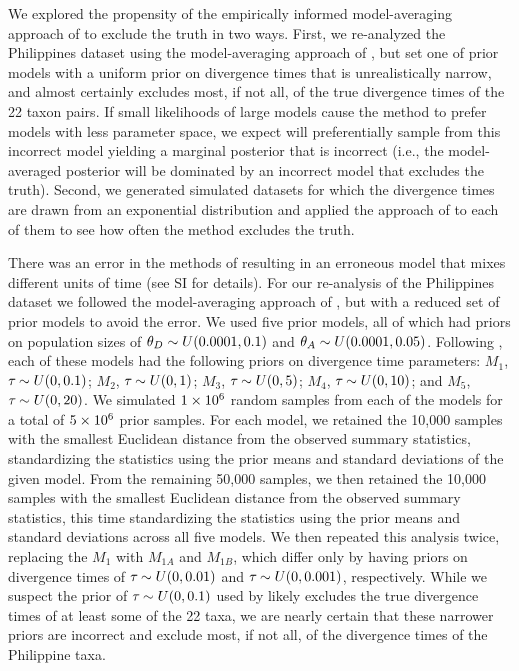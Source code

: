 \documentclass[letterpaper,12pt]{article}
\begin{document}
\begin{linenumbers}
We explored the propensity of the empirically informed model-averaging approach
of \citet{Hickerson2013} to exclude the truth in two ways.
First, we re-analyzed the Philippines dataset using the model-averaging approach
of \citet{Hickerson2013}, but set one of prior models with a uniform prior on
divergence times that is unrealistically narrow, and almost certainly excludes
most, if not all, of the true divergence times of the 22 taxon pairs.
If small likelihoods of large models cause the method to prefer models with
less parameter space, we expect \msb will preferentially sample from this
incorrect model yielding a marginal posterior that is incorrect (i.e., the
model-averaged posterior will be dominated by an incorrect model that excludes
the truth).
Second, we generated simulated datasets for which the divergence times are
drawn from an exponential distribution and applied the approach of
\citet{Hickerson2013} to each of them to see how often the method excludes the
truth.

There was an error in the methods of \citet{Hickerson2013} resulting in
an erroneous model that mixes different units of time (see SI for
details).
For our re-analysis of the Philippines dataset we followed the model-averaging
approach of \citet{Hickerson2013}, but with a reduced set of prior models to
avoid the error.
We used five prior models, all of which had priors on population sizes of
$\meanDescendantTheta{} \sim U(0.0001, 0.1)$ and $\ancestralTheta{} \sim
U(0.0001, 0.05)$.
Following \citet{Hickerson2013}, each of these models had the following
priors on divergence time parameters:
$M_1$, $\tau_{} \sim U(0, 0.1)$;
$M_2$, $\tau_{} \sim U(0, 1)$;
$M_3$, $\tau_{} \sim U(0, 5)$;
$M_4$, $\tau_{} \sim U(0, 10)$; and
$M_5$, $\tau_{} \sim U(0, 20)$.
We simulated $1\times 10^{6}$ random samples from each of the models for a total of
$5\times 10^{6}$ prior samples.
For each model, we retained the 10,000 samples with the smallest Euclidean
distance from the observed summary statistics, standardizing the statistics
using the prior means and standard deviations of the given model.
From the remaining 50,000 samples, we then retained the 10,000 samples with the
smallest Euclidean distance from the observed summary statistics, this time
standardizing the statistics using the prior means and standard deviations
across all five models.
We then repeated this analysis twice, replacing the $M_1$ with
$M_{1A}$ and $M_{1B}$, which differ only by having priors on divergence
times of $\tau_{} \sim U(0, 0.01)$ and $\tau_{} \sim U(0, 0.001)$,
respectively.
While we suspect the prior of $\tau_{} \sim U(0, 0.1)$ used by
\citet{Hickerson2013} likely excludes the true divergence times of at least
some of the 22 taxa, we are nearly certain that these narrower priors are
incorrect and exclude most, if not all, of the divergence times of the
Philippine taxa.


\end{linenumbers}
\end{document}

